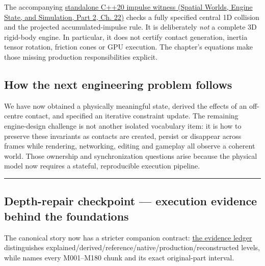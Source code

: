 The accompanying \href{../05-Spatial-Worlds-Engine-State-and-Simulation-P02/main.pdf\#source-file-128143bcbfc7213e97eaefa4}{standalone C++20 impulse witness (Spatial Worlds, Engine State, and Simulation, Part 2, Ch. 22)} checks a fully specified central 1D collision and the projected accumulated-impulse rule. It is deliberately \emph{not} a complete 3D rigid-body engine. In particular, it does not certify contact generation, inertia tensor rotation, friction cones or GPU execution. The chapter's equations make those missing production responsibilities explicit.

\subsection{How the next engineering problem follows}\label{02-foundations-ii-ch039-how-the-next-engineering-problem-follows}

\hypertarget{02-foundations-ii-ch039-how-the-next-engineering-problem-follows}{}

We have now obtained a physically meaningful state, derived the effects of an off-centre contact, and specified an iterative constraint update. The remaining engine-design challenge is not another isolated vocabulary item: it is how to preserve these invariants as contacts are created, persist or disappear across frames while rendering, networking, editing and gameplay all observe a coherent world. Those ownership and synchronization questions arise because the physical model now requires a stateful, reproducible execution pipeline.

\begin{center}\rule{0.5\linewidth}{0.5pt}\end{center}

\subsection{Depth-repair checkpoint --- execution evidence behind the foundations}\label{02-foundations-ii-ch039-depth-repair-checkpoint-execution-evidence-behind-the-foundations}

\hypertarget{02-foundations-ii-ch039-depth-repair-checkpoint-execution-evidence-behind-the-foundations}{}

The canonical story now has a stricter companion contract: \hyperref[appendix-2358b21a702d]{the evidence ledger} distinguishes explained/derived/reference/native/production/reconstructed levels, while  names every M001--M180 chunk and its exact original-part interval.


